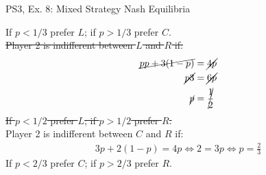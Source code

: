 \begin{frame}{PS3, Ex. 8: Mixed Strategy Nash Equilibria}
\begin{multicols}{2}
    If $p<1/3$ prefer $L$; if $p>1/3$ prefer $C$.\\\medskip
    \sout{Player 2 is indifferent between $L$ and $R$ if:}
    \begin{align*}
      \cancel{pp+3(1-p)}&= \cancel{4p } \\
      \cancel{p3}       &= \cancel{6p } \\
      \cancel{p}        &= \cancel{\frac{1}{2} }
    \end{align*}
    \sout{If $p<1/2$ prefer $L$; if $p>1/2$ prefer $R$.}\\\medskip
    Player 2 is indifferent between $C$ and $R$ if:
    \begin{align*}
      3p+2(1-p) = 4p \Leftrightarrow 2 = 3p \Leftrightarrow p = \frac{2}{3}
    \end{align*}
    If $p<2/3$ prefer $C$; if $p>2/3$ prefer $R$.\\\medskip
  \vfill\null
  \end{multicols}
\end{frame}
